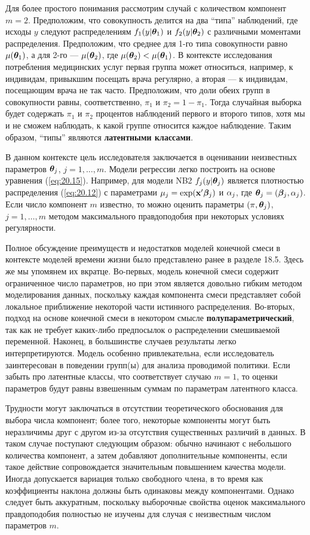 Для более простого понимания рассмотрим случай с количеством компонент $m = 2$. Предположим, что совокупность делится на два ``типа'' наблюдений, где исходы $y$ следуют распределениям $f_1 (y|\bm{\theta}_1)$ и $f_2 (y|\bm{\theta}_2)$ с различными моментами распределения. Предположим, что среднее для 1-го типа совокупности равно $\mu(\bm{\theta}_1)$, а для 2-го --- $\mu(\bm{\theta}_2)$, где $\mu(\bm{\theta}_2) < \mu(\bm{\theta}_1)$. В контексте исследования потребления медицинских услуг первая группа может относиться, например, к индивидам, привыкшим посещать врача регулярно, а вторая --- к индивидам, посещающим врача не так часто. Предположим, что доли обеих групп в совокупности равны, соответственно, $\pi_1$ и $\pi_2 = 1 - \pi_1$. Тогда случайная выборка будет содержать $\pi_1$ и $\pi_2$ процентов наблюдений первого и второго типов, хотя мы и не сможем наблюдать, к какой группе относится каждое наблюдение. Таким образом, ``типы'' являются \textbf{латентными классами}.

В данном контексте цель исследователя заключается в оценивании неизвестных параметров $\bm{\theta}_j$, $j = 1, \ldots , m$. Модели регрессии легко построить на основе уравнения (\ref{eq:20.15}). Например, для модели NB2 $f_j(y|\bm{\theta}_j)$ является плотностью распределения (\ref{eq:20.12}) с параметрами $\mu_j = \exp(\mathbf{x}'\bm{\beta}_j)$ и $\alpha_j$, где $\bm{\theta}_j = (\bm{\beta}_j, \alpha_j)$. Если число компонент $m$ известно, то можно оценить параметры $(\pi, \bm{\theta}_j)$, $j = 1, \ldots , m$ методом максимального правдоподобия при некоторых условиях регулярности.

Полное обсуждение преимуществ и недостатков моделей конечной смеси в контексте моделей времени жизни было представлено ранее в разделе 18.5. Здесь же мы упомянем их вкратце. Во-первых, модель конечной смеси содержит ограниченное число параметров, но при этом является довольно гибким методом моделирования данных, поскольку каждая компонента смеси представляет собой локальное приближение некоторой части истинного распределения. Во-вторых, подход на основе конечной смеси в некотором смысле \textbf{полупараметрический}, так как не требует каких-либо предпосылок о распределении смешиваемой переменной. Наконец, в большинстве случаев результаты легко интерпретируются. Модель особенно привлекательна, если исследователь заинтересован в поведении групп(ы) для анализа проводимой политики. Если забыть про латентные классы, что соответствует случаю $m = 1$, то оценки параметров будут равны взвешенным суммам по параметрам латентного класса.

Трудности могут заключаться в отсутствии теоретического обоснования для выбора числа компонент; более того, некоторые компоненты могут быть неразличимы друг с другом из-за отсутствия существенных различий в данных. В таком случае поступают следующим образом: обычно начинают с небольшого количества компонент, а затем добавляют дополнительные компоненты, если такое действие сопровождается значительным повышением качества модели. Иногда допускается вариация только свободного члена, в то время как коэффициенты наклона должны быть одинаковы между компонентами. Однако следует быть аккуратным, поскольку выборочные свойства оценок максимального правдоподобия полностью не изучены для случая с неизвестным числом параметров $m$.

